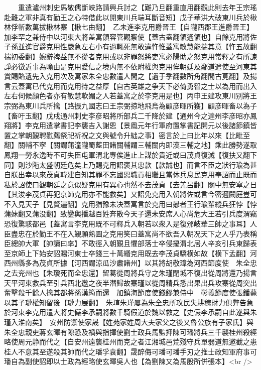 　　重遣瀘州刺史馬敬儒斷峽路請興兵討之【難乃旦翻重直用翻觀此則去年王宗瑤赴難之軍非真有勤王之心特借此以開東川兵端耳斷音短】戊子華洪大破東川兵於楸林俘斬數萬拔楸林寨【楸七由翻】　乙未進李克用爵晉王【自隴西郡王進爵晉王】加李罕之兼侍中以河東大將盖寓領容管觀察使【蓋古盍翻領遙領也】自餘克用將佐子孫並進官爵克用性嚴急左右小有過輒死無敢違忤惟蓋寓敏慧能揣其意【忤五故翻揣初委翻】婉辭禆益無不從者克用或以非罪怒將吏寓必陽助之怒克用常釋之有所諫諍必徵近事為喻由是克用愛信之境内無不依附權與克用侔朝廷及鄰道遣使至河東其賞賜賂遺先入克用次及寓家朱全忠數遣人間之【遺于季翻數所角翻間古莧翻】及揚言云蓋寓已代克用而克用待之益厚【自古英雄之争天下必倚勇智之士以為用而出入左右伺候顔色者亦有敏慧軟媚之人若蓋寓之於李克用是也】丙申王建攻東川别將王宗弼為東川兵所擒【路振九國志曰王宗弼掠地飛烏為顧彦暉所獲】顧彦暉畜以為子【畜吁玉翻】戊戌通州刺史李彦昭將所部兵二千降於建【通州今之達州李彦昭亦鳳翔將】李克用遣掌書記李襲吉入謝恩【景鳳元年行軍府置掌書記開元以後諸節鎮皆置之掌朝覲聘慰薦祭祀祈祝之文與號令升絀之事】密言於上曰比年以來【比毗至翻】關輔不寧【關謂蒲潼隴蜀藍田諸關輔謂三輔關内即漢三輔之地】乘此勝勢遂取鳳翔一勞永逸時不可失臣屯軍渭北專俟進止上謀於貴近或曰茂貞復滅【復扶又翻下同】則沙陁太盛朝廷危矣上乃賜克用詔褒其忠款【款誠也】而言不臣之狀行瑜為甚自朕出幸以來茂貞韓建自知其罪不忘國恩職貢相繼且當休兵息民克用奉詔而止既而私於詔使曰觀朝廷之意似疑克用有異心也然不去茂貞【去羌呂翻】關中無安寧之日【其浚李茂貞再犯京師克用亦不能救矣】又詔免克用入朝將佐或言今密邇闕庭豈可不入見天子【見賢遍翻】克用猶豫未决蓋寓言於克用曰曏者王行瑜輩縱兵狂悖【悖蒲妹翻又蒲没翻】致鑾輿播越百姓奔散今天子還未安席人心尚危大王若引兵度渭竊恐復驚駭都邑【蓋寓言李克用既不可釋兵入朝若以衆入是復邠岐華三帥之事耳】人臣盡忠在於勤王不在入覲願熟圖之克用笑曰蓋寓尚不欲吾入朝况天下之人乎乃表稱臣總帥大軍【帥讀曰率】不敢徑入朝覲且懼部落士卒侵擾渭北居人辛亥引兵東歸表至京師上下始安詔賜河東士卒錢三十萬緡克用既去李茂貞驕横如故【横下孟翻】河西州縣多為茂貞所據【河西謂涼瓜沙肅諸州】以其將胡敬璋為河西節度使　朱全忠之去兖州也【朱瓊死而全忠還】留葛從周將兵守之朱瑾閉城不復出從周將還乃揚言天平河東救兵至引兵西北邀之夜半潛歸故寨瑾以從周精兵悉出果出兵攻寨從周突出奮擊殺千餘人擒其都將孫漢筠而還　加鎮海節度使錢鏐兼侍中　彰義節度使張鐇薨以其子璉權知留後【璉力展翻】　朱瑄朱瑾屢為朱全忠所攻民失耕稼財力俱弊告急於河東李克用遣大將史儼李承嗣將數千騎假道於魏以救之【史儼李承嗣自此遂與朱瑾入淮南矣】　安州防禦使家晟【姓苑家姓周大夫家父之後又魯公族有子家氏】與朱全忠親吏蔣玄暉有隙恐及禍與指揮使劉士政兵馬監押陳可璠將兵三千襲桂州殺經略使周元静而代之【自安州遠襲桂州而克之者江湘城邑荒殘守兵單弱道無邀截之患桂人不意其至遂殺其帥而代之璠孚袁翻】晟醉侮可璠可璠手刃之推士政知軍府事可璠自為副使詔即以士政為經略使玄暉吳人也【為劉陳又為馬殷所併張本】<br />
